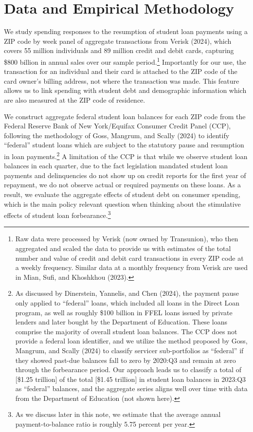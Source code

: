 \documentclass[
  letterpaper,
  DIV=11,
  numbers=noendperiod]{scrartcl}
\begin{document}
\section{Data and Empirical
Methodology}\label{data-and-empirical-methodology}

We study spending responses to the resumption of student loan payments
using a ZIP code by week panel of aggregate transactions from Verisk
(2024), which covers 55 million individuals and 89 million credit and
debit cards, capturing \$800 billion in annual sales over our sample
period.\footnote{Raw data were processed by Verisk (now owned by
  Transunion), who then aggregated and scaled the data to provide us
  with estimates of the total number and value of credit and debit card
  transactions in every ZIP code at a weekly frequency. Similar data at
  a monthly frequency from Verisk are used in Mian, Sufi, and Khoshkhou
  (2023).} Importantly for our use, the transaction for an individual
and their card is attached to the ZIP code of the card owner's billing
address, not where the transaction was made. This feature allows us to
link spending with student debt and demographic information which are
also measured at the ZIP code of residence.

We construct aggregate federal student loan balances for each ZIP code
from the Federal Reserve Bank of New York/Equifax Consumer Credit Panel
(CCP), following the methodology of Goss, Mangrum, and Scally (2024) to
identify ``federal'' student loans which are subject to the statutory
pause and resumption in loan payments.\footnote{As discussed by
  Dinerstein, Yannelis, and Chen (2024), the payment pause only applied
  to ``federal'' loans, which included all loans in the Direct Loan
  program, as well as roughly \$100 billion in FFEL loans issued by
  private lenders and later bought by the Department of Education. These
  loans comprise the majority of overall student loan balances. The CCP
  does not provide a federal loan identifier, and we utilize the method
  proposed by Goss, Mangrum, and Scally (2024) to classify servicer
  sub-portfolios as ``federal'' if they showed past-due balances fall to
  zero by 2020:Q3 and remain at zero through the forbearance period. Our
  approach leads us to classify a total of {[}\$1.25 trillion{]} of the
  total {[}\$1.45 trillion{]} in student loan balances in 2023:Q3 as
  ``federal'' balances, and the aggregate series aligns well over time
  with data from the Department of Education (not shown here).} A
limitation of the CCP is that while we observe student loan balances in
each quarter, due to the fact legislation mandated student loan payments
and delinquencies do not show up on credit reports for the first year of
repayment, we do not observe actual or required payments on these loans.
As a result, we evaluate the aggregate effects of student debt on
consumer spending, which is the main policy relevant question when
thinking about the stimulative effects of student loan
forbearance.\footnote{As we discuss later in this note, we estimate that
  the average annual payment-to-balance ratio is roughly 5.75 percent
  per year.}
\end{document}
